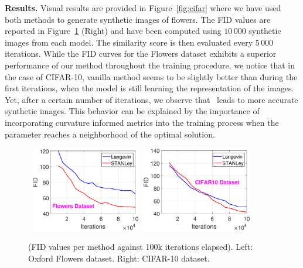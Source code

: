 \documentclass[10pt,twocolumn,letterpaper]{article}
\begin{document}
\medskip
\textbf{Results.} 
Visual results are provided in Figure~\ref{fig:cifar} where we have used both methods to generate synthetic images of flowers.
The FID values are reported in Figure~\ref{fig:fidall} (Right) and have been computed using $10\,000$ synthetic images from each model.
The similarity score is then evaluated every $5\,000$ iterations. 
While the FID curves for the Flowers dataset exhibits a superior performance of our method throughout the training procedure, we notice that in the case of CIFAR-10, vanilla method seems to be slightly better than \algo\. during the first iterations, \ie when the model is still learning the representation of the images.
Yet, after a certain number of iterations, we observe that \algo\ leads to more accurate synthetic images.
This behavior can be explained by the importance of incorporating curvature informed metrics into the training process when the parameter reaches a neighborhood of the optimal solution.




\begin{figure}[H]
\begin{center}
\mbox{\hspace{-0.2in}
        \includegraphics[width=1.9in]{figs/fid_flowers.eps} \hspace{-0.2in}
        \includegraphics[width=1.9in]{figs/fid_cifar.eps}
}
\end{center}
	\caption{(FID values per method against 100k iterations elapsed). Left: Oxford Flowers dataset. Right: CIFAR-10 dataset.}
	\label{fig:fidall}
\end{figure}
\end{document}

